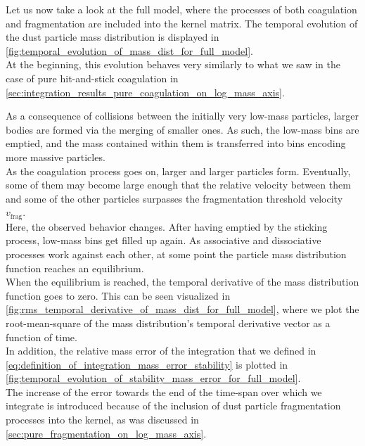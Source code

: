         Let us now take a look at the full model, where the processes of both coagulation and 
        fragmentation are included into the kernel matrix. The temporal evolution of the dust 
        particle mass distribution is displayed in
        \cref{fig:temporal_evolution_of_mass_dist_for_full_model}. \\

        At the beginning, this evolution behaves very similarly to what we saw in the case of 
        pure hit-and-stick coagulation in
        \cref{sec:integration_results_pure_coagulation_on_log_mass_axis}.

        As a consequence of collisions between the initially very low-mass particles, 
        larger bodies are formed via the merging of smaller ones. As such, the low-mass bins 
        are emptied, and the mass contained within them is transferred into bins encoding 
        more massive particles. \\

        As the coagulation process goes on, larger and larger particles form. Eventually,
        some of them may become large enough that the relative velocity between them and 
        some of the other particles surpasses the fragmentation threshold velocity 
        $v_\text{frag}$. \\

        Here, the observed behavior changes. After having emptied by the sticking process, 
        low-mass bins get filled up again. As associative and dissociative processes work 
        against each other, at some point the particle mass distribution function reaches 
        an equilibrium. \\

        When the equilibrium is reached, the temporal derivative of the mass distribution 
        function goes to zero. This can be seen visualized in 
        \cref{fig:rms_temporal_derivative_of_mass_dist_for_full_model}, where we plot 
        the root-mean-square of the mass distribution's temporal derivative vector as a 
        function of time. \\

        In addition, the relative mass error of the integration that we defined in 
        \cref{eq:definition_of_integration_mass_error_stability} is plotted in 
        \cref{fig:temporal_evolution_of_stability_mass_error_for_full_model}. \\

        The increase of the error towards the end of the time-span over which we 
        integrate is introduced because of the inclusion of dust particle 
        fragmentation processes into the kernel, as was discussed in
        \cref{sec:pure_fragmentation_on_log_mass_axis}.

